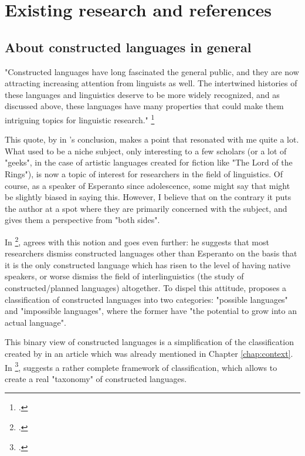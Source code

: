 \chapter{Existing research and references}

\section{About constructed languages in general}

"Constructed languages have long fascinated the general public, and they are now attracting
increasing attention from linguists as well. The intertwined histories of these languages and
linguistics deserve to be more widely recognized, and as discussed above, these languages have
many properties that could make them intriguing topics for linguistic research."
\footcite{goodall2023constructed} \newline

This quote, by \citeauthor{goodall2023constructed} in 's conclusion,
makes a point that resonated with me quite a lot. What used to be a niche subject, only interesting
to a few scholars (or a lot of "geeks", in the case of artistic languages created for fiction like
"The Lord of the Rings"), is now a topic of interest for researchers in the field of linguistics.
Of course, as a speaker of Esperanto since adolescence, some might say that \citeauthor{goodall2023constructed}
might be slightly biased in saying this. However, I believe that on the contrary it puts the author
at a spot where they are primarily concerned with the subject, and gives them a perspective from "both
sides". \newline

In  \footcite{oostendorp2001constructed},
\citeauthor{oostendorp2001constructed} agrees with this notion and goes even further: he suggests that
most researchers dismiss constructed languages other than Esperanto on the basis that it is the only
constructed language which has risen to the level of having native speakers, or worse dismiss the field
of interlinguistics (the study of constructed/planned languages) altogether. To dispel this attitude,
\citeauthor{oostendorp2001constructed} proposes a classification of constructed languages into two categories:
"possible languages" and "impossible languages", where the former have "the potential to grow into an actual language".

This binary view of constructed languages is a simplification of the classification created by \citeauthor{blanke1989planned}
in an article which was already mentioned in Chapter \ref{chap:context}. In 
\footcite{blanke1989planned}, \citeauthor{blanke1989planned} suggests a rather complete framework of classification,
which allows to create a real "taxonomy" of constructed languages.\newline

